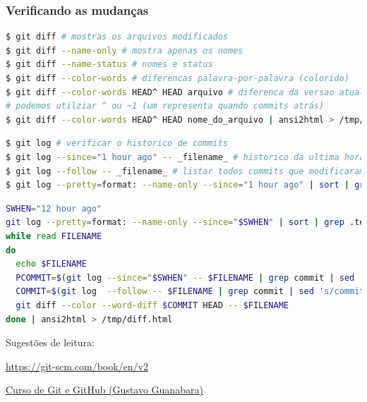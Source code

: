 \begin{frame}
\frametitle{Verificando as mudanças}
\begin{lstlisting}[language=bash, label=lst-git-diff, caption={Analisando as mudanças realizadas.}, postbreak=\mbox{$\hookrightarrow$\space}, basicstyle=\fontsize{8}{10}\selectfont\ttfamily]
$ git diff # mostras os arquivos modificados
$ git diff --name-only # mostra apenas os nomes
$ git diff --name-status # nomes e status
$ git diff --color-words # diferencas palavra-por-palavra (colorido)
$ git diff --color-words HEAD^ HEAD arquivo # diferenca da versao atual com o commit anterior
# podemos utilziar ^ ou ~1 (um representa quando commits atrás)
$ git diff --color-words HEAD^ HEAD nome_do_arquivo | ansi2html > /tmp/diff.html # gerar um relatio em HTML
\end{lstlisting}

\framebreak

\begin{lstlisting}[language=bash, label=lst-git-log, caption={Log das alterações.}, postbreak=\mbox{$\hookrightarrow$\space}, basicstyle=\fontsize{8}{10}\selectfont\ttfamily]
$ git log # verificar o historico de commits
$ git log --since="1 hour ago" -- _filename_ # historico da ultima hora para um arquivo
$ git log --follow -- _filename_ # listar todos commits que modificaram um arquivo
$ git log --pretty=format: --name-only --since="1 hour ago" | sort | grep .tex | uniq # para listar todos os arquivos que foram modificados na ultima hora
\end{lstlisting}

\framebreak

\begin{lstlisting}[language=bash, label=lst-git-diff2, caption={Script para gerar um relatório das mudanças nas últimas horas em arquivos \texttt{.tex}.}, postbreak=\mbox{$\hookrightarrow$\space}, basicstyle=\fontsize{8}{10}\selectfont\ttfamily]
SWHEN="12 hour ago"
git log --pretty=format: --name-only --since="$SWHEN" | sort | grep .tex | uniq |
while read FILENAME
do
  echo $FILENAME
  PCOMMIT=$(git log --since="$SWHEN" -- $FILENAME | grep commit | sed 's/commit //g' | tail -n 1)
  COMMIT=$(git log  --follow -- $FILENAME | grep commit | sed 's/commit //g' | sed -e "1,/$PCOMMIT/d" | head -n 1)
  git diff --color --word-diff $COMMIT HEAD -- $FILENAME
done | ansi2html > /tmp/diff.html
\end{lstlisting}
\end{frame}





\begin{frame}
Sugestões de leitura: 
\vspace{2ex}

\url{https://git-scm.com/book/en/v2}

\vspace{3ex}
\href{https://www.youtube.com/watch?v=xEKo29OWILE&list=PLHz_AreHm4dm7ZULPAmadvNhH6vk9oNZA}{Curso de Git e GitHub (Gustavo Guanabara)}

\end{frame}


